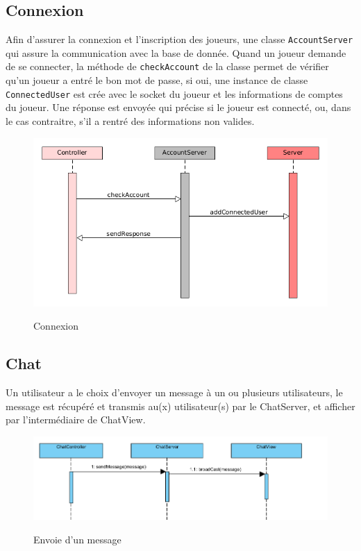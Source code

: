 \documentclass[../design_fonctionnement_sys.tex]{subfiles}
\begin{document}
\subsection{Connexion}
Afin d'assurer la connexion et l'inscription des joueurs, une classe \texttt{AccountServer} qui assure la communication avec la base de donnée. 
Quand un joueur demande de se connecter, la méthode de \texttt{checkAccount} 
de la classe permet de vérifier qu'un joueur a entré le bon mot de passe, si oui, 
une instance de classe \texttt{ConnectedUser} est crée avec le socket du joueur et les informations de comptes du joueur. 
Une réponse est envoyée qui précise si le joueur est connecté, ou, dans le cas contraitre, s'il a rentré des informations non valides.
\begin{figure}[H]
    \centering
    \includegraphics[scale=0.4]{img_design/connexion_seq.png}
    \label{fig:seq_match_client}
    \caption{Connexion}
\end{figure}


\subsection{Chat}
Un utilisateur a le choix d'envoyer un message à un ou plusieurs utilisateurs, le message est récupéré et transmis
au(x) utilisateur(s) par le ChatServer, et afficher par l'intermédiaire de ChatView.
\begin{figure}[H]
    \centering
    \includegraphics[scale=0.3]{img_design/Chat_DS.png}
    \label{fig:seq_match_client}
    \caption{Envoie d'un message}
\end{figure}
\end{document}
